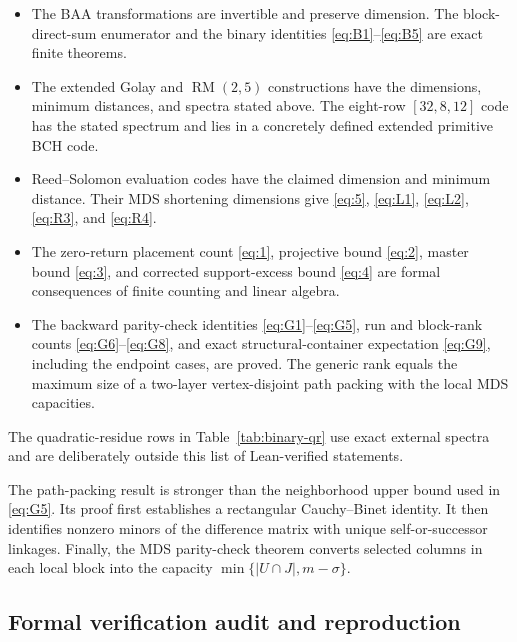 \begin{itemize}
    \item The BAA transformations are invertible and preserve dimension.  The
          block-direct-sum enumerator and the binary identities
          \eqref{eq:B1}--\eqref{eq:B5} are
          exact finite theorems.
    \item The extended Golay and $\operatorname{RM}(2,5)$ constructions have
          the dimensions, minimum distances, and spectra stated above.  The
          eight-row $[32,8,12]$ code has the stated spectrum and lies in a
          concretely defined extended primitive BCH code.
    \item Reed--Solomon evaluation codes have the claimed dimension and
          minimum distance.  Their MDS shortening dimensions give
          \eqref{eq:5}, \eqref{eq:L1}, \eqref{eq:L2}, \eqref{eq:R3}, and
          \eqref{eq:R4}.
    \item The zero-return placement count \eqref{eq:1}, projective bound
          \eqref{eq:2}, master bound \eqref{eq:3}, and corrected support-excess
          bound \eqref{eq:4} are formal
          consequences of finite counting and linear algebra.
    \item The backward parity-check identities \eqref{eq:G1}--\eqref{eq:G5}, run and block-rank
          counts \eqref{eq:G6}--\eqref{eq:G8}, and exact structural-container
          expectation \eqref{eq:G9},
          including the endpoint cases, are proved.  The generic rank equals
          the maximum size of a two-layer
          vertex-disjoint path packing with the local MDS capacities.
\end{itemize}

The quadratic-residue rows in Table~\ref{tab:binary-qr} use exact external
spectra and are deliberately outside this list of Lean-verified statements.

The path-packing result is stronger than the neighborhood upper bound used in
\eqref{eq:G5}.  Its proof first establishes a rectangular Cauchy--Binet identity.  It
then identifies nonzero minors of the difference matrix with unique
self-or-successor linkages.  Finally, the MDS parity-check theorem converts
selected columns in each local block into the capacity
$\min\{|U\cap J|,m-\sigma\}$.




\subsection{Formal verification audit and reproduction}
\label{app:lean-audit}


